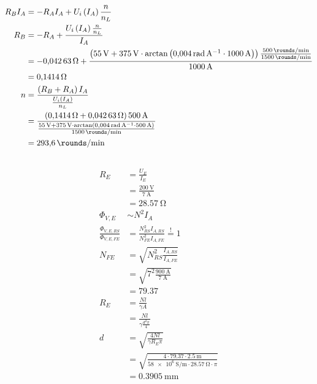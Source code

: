 \documentclass[11pt,a4paper]{scrartcl}
\newcommand{\mybr}[1]{\left(#1\right)}
\newcommand{\0}{_{\mybr{0}}}
\newcommand{\1}{_{\mybr{1}}}
\newcommand{\2}{_{\mybr{2}}}
\begin{document}
\subsection{}
\begin{align}
R_B I_A&=-R_A I_A + U_i\mybr{I_A}\frac{n}{n_L}\\
R_B&=-R_A+\frac{U_i\mybr{I_A}\frac{n}{n_L}}{I_A}\\
&=-\SI{0.04263}{\ohm}+\frac{\mybr{\SI{55}{\volt}+\SI{375}{\volt}\cdot\arctan\mybr{\SI{0.004}{\radian\per\ampere}\cdot\SI{1000}{\ampere}}}\frac{\SI{500}{\rounds\per\minute}}{\SI{1500}{\rounds\per\minute}}}{\SI{1000}{\ampere}}\\
&=\SI{0.1414}{\ohm}\\
n&=\frac{\mybr{R_B+R_A}I_A}{\frac{U_i\mybr{I_A}}{n_L}}\\
&=\frac{\mybr{\SI{0.1414}{\ohm}+\SI{0.04263}{\ohm}}\SI{500}{\ampere}}{\frac{\SI{55}{\volt}+\SI{375}{\volt}\cdot\arctan\mybr{\SI{0.004}{\radian\per\ampere}\cdot\SI{500}{\ampere}}}{\SI{1500}{\rounds\per\minute}}}\\
&=\SI{293.6}{\rounds\per\minute}
\end{align}

\subsection{}
\begin{align}
R_E&=\frac{U_E}{I_E}\\
&=\frac{\SI{200}{\volt}}{\SI{7}{\ampere}}\\
&=\SI{28.57}{\ohm}\\
\Phi_{V,E}&\sim N^2 I_A\\
\frac{\Phi_{V,E,RS}}{\Phi_{V,E,FE}}&=\frac{N_{RS}^2 I_{A,RS}}{N_{FE}^2 I_{A,FE}}\overset{!}{=}1\\
N_{FE}&=\sqrt{N_{RS}^2\frac{I_{A,RS}}{I_{A,FE}}}\\
&=\sqrt{7^2\frac{\SI{900}{\ampere}}{\SI{7}{\ampere}}}\\
&=\num{79.37}\\
R_E&=\frac{N l}{\gamma A}\\
&=\frac{N l}{\gamma \frac{d^2 \pi}{4}}\\
d&=\sqrt{\frac{4 N l }{\gamma R_E \pi}}\\
&=\sqrt{\frac{4\cdot\num{79.37}\cdot\SI{2.5}{\meter}}{\SI{58e6}{\siemens\per\meter}\cdot\SI{28.57}{\ohm}\cdot\pi}}\\
&=\SI{0.3905}{\milli\meter}
\end{align}
\end{document}
